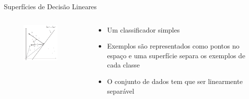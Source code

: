 \documentclass{beamer}
\begin{document}
\begin{frame}{Superfícies de Decisão Lineares}
\begin{columns}
    \begin{column}{.49\textwidth}
    \begin{figure}
      \centering
      \includegraphics[width=0.8\textwidth]{svm_1.png}
    \end{figure}
    \end{column}
    \begin{column}{.49\textwidth}
      \begin{itemize}
      \item {
        Um classificador simples
      }
      \item {
        Exemplos são representados como pontos no espaço e uma superfície separa os exemplos de cada classe
      }
      \item {
        O conjunto de dados tem que ser linearmente separável
      }
      \end{itemize}
    \end{column}
\end{columns}
\end{frame}
\end{document}
